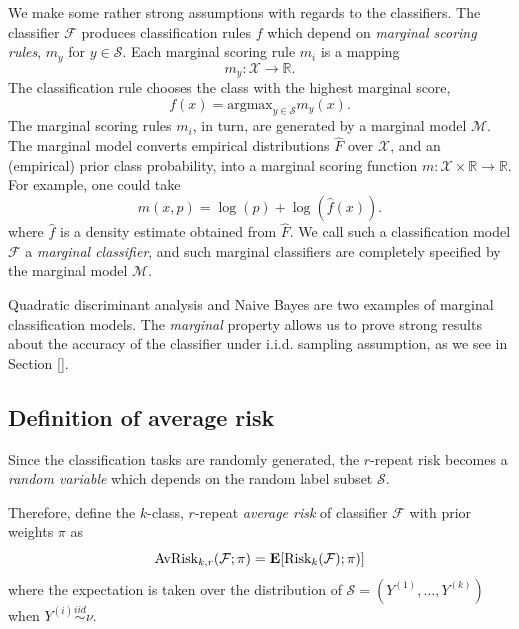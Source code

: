 \documentclass[12pt]{article}
\begin{document}
We make some rather strong assumptions with regards to the
classifiers.  The classifier $\mathcal{F}$ produces classification
rules $f$ which depend on \emph{marginal scoring rules}, $m_y$ for $y
\in \mathcal{S}$.  Each marginal scoring rule $m_i$ is a mapping
\[
m_y: \mathcal{X} \to \mathbb{R}.
\]
The classification rule chooses the class with the highest marginal score,
\[
f(x) = \text{argmax}_{y \in \mathcal{S}} m_y(x).
\]
The marginal scoring rules $m_i$, in turn, are generated by a marginal
model $\mathcal{M}$.  The marginal model converts empirical
distributions $\hat{F}$ over $\mathcal{X}$, and an (empirical) prior
class probability, into a marginal scoring function $m: \mathcal{X}
\times \mathbb{R} \to \mathbb{R}$.  For example, one could take 
\[m(x,p) = \log(p) + \log(\hat{f}(x)).\]
where $\hat{f}$ is a density estimate obtained from
$\hat{F}$.  We call such a classification model $\mathcal{F}$ a
\emph{marginal classifier}, and such marginal classifiers are
completely specified by the marginal model $\mathcal{M}.$

Quadratic discriminant analysis and Naive Bayes are two examples of
marginal classification models.
The \emph{marginal} property allows us to prove strong results about
the accuracy of the classifier under i.i.d. sampling
assumption, as we see in Section [].

\subsection{Definition of average risk}\label{sec:average_risk}

Since the classification tasks are randomly generated, the $r$-repeat
risk becomes a \emph{random variable} which depends on the random
label subset $\mathcal{S}$.

Therefore, define the $k$-class, $r$-repeat \emph{average risk} of
classifier $\mathcal{F}$ with prior weights $\pi$ as
\[
\text{AvRisk}_{k, r}(\mathcal{F}; \pi) = \textbf{E}[\text{Risk}_k(\mathcal{F}); \pi)]
\]
where the expectation is taken over the distribution of $\mathcal{S} =
(Y^{(1)},\hdots, Y^{(k)})$ when $Y^{(i)} \stackrel{iid}{\sim} \nu$.
\end{document}
